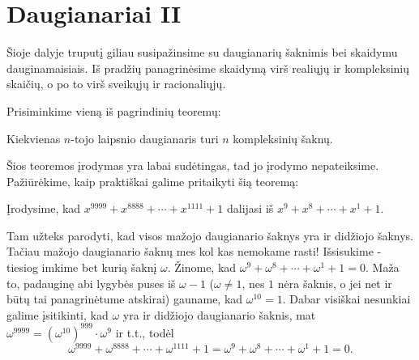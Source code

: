 
  
\section{Daugianariai II} \bigskip \noindent

Šioje dalyje truputį giliau susipažinsime su daugianarių šaknimis bei
skaidymu dauginamaisiais. Iš pradžių panagrinėsime skaidymą virš realiųjų
ir kompleksinių skaičių, o po to virš sveikųjų ir racionaliųjų.

Prisiminkime vieną iš pagrindinių teoremų:

\begin{thm} Kiekvienas $n$-tojo laipsnio
  daugianaris turi $n$ kompleksinių šaknų.  \end{thm}

Šios teoremos įrodymas yra labai sudėtingas, tad jo įrodymo nepateiksime.
Pažiūrėkime, kaip praktiškai galime pritaikyti šią teoremą:  

Įrodysime, kad $x^{9999} + x^{8888} + \cdots + x^{1111} + 1$ dalijasi iš
$x^{9} + x^{8} + \cdots + x^{1} + 1.$

Tam užteks parodyti, kad visos mažojo daugianario šaknys yra ir didžiojo
šaknys. Tačiau mažojo daugianario šaknų mes kol kas nemokame rasti!
Išsisukime - tiesiog imkime bet kurią šaknį $\omega$. Žinome, kad
$\omega^{9} + \omega^{8} + \cdots + \omega^{1} + 1 = 0$. Maža to, padauginę
abi lygybės puses iš $\omega - 1$ ($\omega {}$, nes $1$ nėra šaknis, o
jei net ir būtų tai panagrinėtume atskirai) gauname, kad $\omega^{10} = 1$.
Dabar visiškai nesunkiai galime įsitikinti, kad $\omega$ yra ir didžiojo
daugianario šaknis, mat $\omega^{9999} = (\omega^{10})^{999}\cdot \omega^9$
ir t.t., todėl  $$ \omega^{9999} + \omega^{8888} + \cdots + \omega^{1111} +
1 = \omega^{9} + \omega^{8} + \cdots + \omega^{1} + 1 = 0.$$

